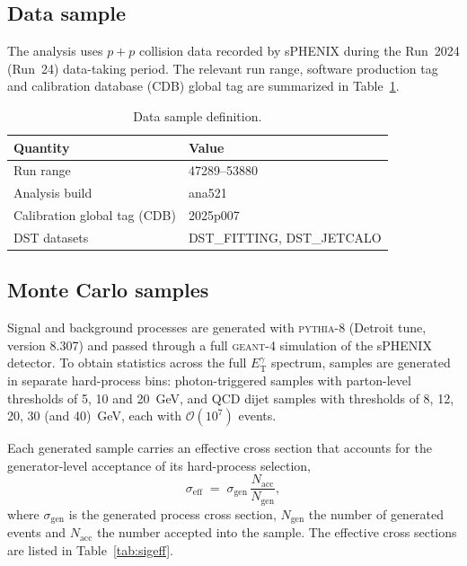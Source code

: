 \documentclass[11pt]{article}
\newcommand{\ETg}{E_{\mathrm{T}}^{\gamma}}
\begin{document}
\subsection{Data sample}

The analysis uses $p+p$ collision data recorded by sPHENIX during the Run~2024
(Run~24) data-taking period. The relevant run range, software production tag and
calibration database (CDB) global tag are summarized in Table~\ref{tab:data}.

\begin{table}[h]
\centering
\caption{Data sample definition.}
\label{tab:data}
\begin{tabular}{ll}
\toprule
Quantity & Value \\
\midrule
Run range & 47289--53880 \\
Analysis build & ana521 \\
Calibration global tag (CDB) & 2025p007 \\
DST datasets & DST\_FITTING, DST\_JETCALO \\
\bottomrule
\end{tabular}
\end{table}

\subsection{Monte Carlo samples}

Signal and background processes are generated with \textsc{pythia-8} (Detroit
tune, version 8.307) and passed through a full \textsc{geant-4} simulation of the
sPHENIX detector. To obtain statistics across the full $\ETg$ spectrum, samples
are generated in separate hard-process bins: photon-triggered samples with
parton-level thresholds of 5, 10 and 20~GeV, and QCD dijet samples with
thresholds of 8, 12, 20, 30 (and 40)~GeV, each with $\mathcal{O}(10^7)$ events.

Each generated sample carries an effective cross section that accounts for the
generator-level acceptance of its hard-process selection,
\begin{equation}
  \sigma_{\mathrm{eff}} \;=\; \sigma_{\mathrm{gen}}\,
  \frac{N_{\mathrm{acc}}}{N_{\mathrm{gen}}},
\end{equation}
where $\sigma_{\mathrm{gen}}$ is the generated process cross section,
$N_{\mathrm{gen}}$ the number of generated events and $N_{\mathrm{acc}}$ the
number accepted into the sample. The effective cross sections are listed in
Table~\ref{tab:sigeff}.
\end{document}
